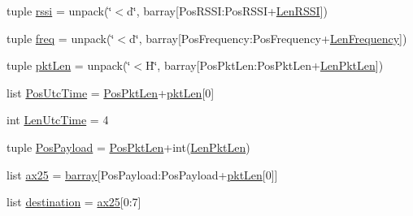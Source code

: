 \begin{DoxyCompactItemize}
tuple \hyperlink{namespace_simulators_1_1_tlmy_decode_test_a2b61b80bc6b9dcbc4e7d584eb54e23b5}{rssi} = unpack(\char`\"{}$<$d\char`\"{}, barray\mbox{[}Pos\+R\+S\+S\+I\+:\+Pos\+R\+S\+S\+I+\hyperlink{namespace_simulators_1_1_tlmy_decode_test_a4230750d2f14e6c0b61c49139afea479}{Len\+R\+S\+S\+I}\mbox{]})
\item 
tuple \hyperlink{namespace_simulators_1_1_tlmy_decode_test_a210b8085d3ac672a73c6a91b4268248f}{freq} = unpack(\char`\"{}$<$d\char`\"{}, barray\mbox{[}Pos\+Frequency\+:\+Pos\+Frequency+\hyperlink{namespace_simulators_1_1_tlmy_decode_test_aa67266bdf51470854eb84aa684fe8333}{Len\+Frequency}\mbox{]})
\item 
tuple \hyperlink{namespace_simulators_1_1_tlmy_decode_test_afab9717fd950d1017ab3cf69343e03a4}{pkt\+Len} = unpack(\char`\"{}$<$H\char`\"{}, barray\mbox{[}Pos\+Pkt\+Len\+:\+Pos\+Pkt\+Len+\hyperlink{namespace_simulators_1_1_tlmy_decode_test_abab63bf6dbfbf6a71ab527e95bf6c55f}{Len\+Pkt\+Len}\mbox{]})
\item 
list \hyperlink{namespace_simulators_1_1_tlmy_decode_test_ab13e258c882d801c05c859e129a025e8}{Pos\+Utc\+Time} = \hyperlink{namespace_simulators_1_1_tlmy_decode_test_a6bc68f210f3bc5ee61a6c1855f717e26}{Pos\+Pkt\+Len}+\hyperlink{namespace_simulators_1_1_tlmy_decode_test_afab9717fd950d1017ab3cf69343e03a4}{pkt\+Len}\mbox{[}0\mbox{]}
\item 
int \hyperlink{namespace_simulators_1_1_tlmy_decode_test_ad5b0247967c08e0d7635ddddf22a76c3}{Len\+Utc\+Time} = 4
\item 
tuple \hyperlink{namespace_simulators_1_1_tlmy_decode_test_aa0a0b8ac56fb8ee3d68a1bb4bf9777b0}{Pos\+Payload} = \hyperlink{namespace_simulators_1_1_tlmy_decode_test_a6bc68f210f3bc5ee61a6c1855f717e26}{Pos\+Pkt\+Len}+int(\hyperlink{namespace_simulators_1_1_tlmy_decode_test_abab63bf6dbfbf6a71ab527e95bf6c55f}{Len\+Pkt\+Len})
\item 
list \hyperlink{namespace_simulators_1_1_tlmy_decode_test_ab722e6f19835692ab6fc8586a9c2bf56}{ax25} = \hyperlink{namespace_simulators_1_1_tlmy_decode_test_a444bda3b0c9df222c86fe82e69c6fe1a}{barray}\mbox{[}Pos\+Payload\+:\+Pos\+Payload+\hyperlink{namespace_simulators_1_1_tlmy_decode_test_afab9717fd950d1017ab3cf69343e03a4}{pkt\+Len}\mbox{[}0\mbox{]}\mbox{]}
\item 
list \hyperlink{namespace_simulators_1_1_tlmy_decode_test_a653c9f1e24a2181b6a8a5de654b8d012}{destination} = \hyperlink{namespace_simulators_1_1_tlmy_decode_test_ab722e6f19835692ab6fc8586a9c2bf56}{ax25}\mbox{[}0\+:7\mbox{]}
\item 

\end{DoxyCompactItemize}
